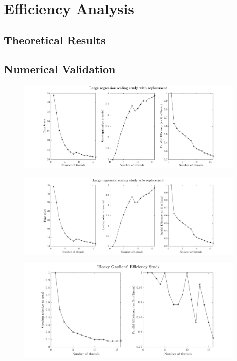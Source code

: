 \section{Efficiency Analysis}

\subsection{Theoretical Results}

\subsection{Numerical Validation}
\begin{figure}[!htb]
  \centering
  \includegraphics[width=1\textwidth]{./resources/replacement}
\end{figure}
\begin{figure}[!htb]
  \centering
  \includegraphics[width=1\textwidth]{./resources/noreplacement}
\end{figure}
\begin{figure}[!htb]
  \centering
  \includegraphics[width=\textwidth]{./resources/heavy_gradient}
\end{figure}
